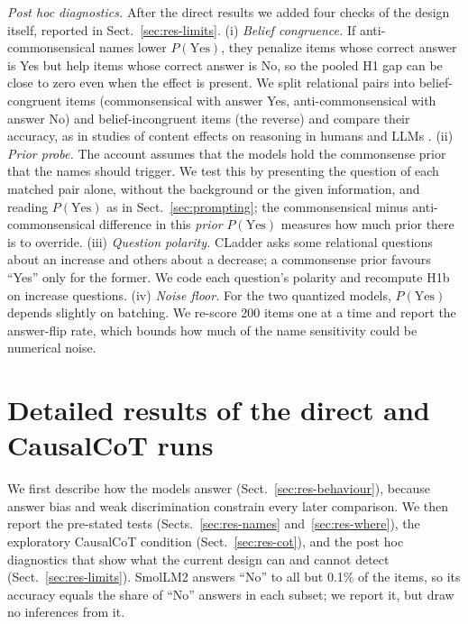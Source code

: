 \emph{Post hoc diagnostics.} After the direct results we added four checks of the design itself, reported in Sect.~\ref{sec:res-limits}. (i) \emph{Belief congruence.} If anti-commonsensical names lower $P(\text{Yes})$, they penalize items whose correct answer is Yes but help items whose correct answer is No, so the pooled H1 gap can be close to zero even when the effect is present. We split relational pairs into belief-congruent items (commonsensical with answer Yes, anti-commonsensical with answer No) and belief-incongruent items (the reverse) and compare their accuracy, as in studies of content effects on reasoning in humans and LLMs \cite{dasgupta2024language}. (ii) \emph{Prior probe.} The account assumes that the models hold the commonsense prior that the names should trigger. We test this by presenting the question of each matched pair alone, without the background or the given information, and reading $P(\text{Yes})$ as in Sect.~\ref{sec:prompting}; the commonsensical minus anti-commonsensical difference in this \emph{prior} $P(\text{Yes})$ measures how much prior there is to override. (iii) \emph{Question polarity.} CLadder asks some relational questions about an increase and others about a decrease; a commonsense prior favours ``Yes'' only for the former. We code each question's polarity and recompute H1b on increase questions. (iv) \emph{Noise floor.} For the two quantized models, $P(\text{Yes})$ depends slightly on batching. We re-score 200 items one at a time and report the answer-flip rate, which bounds how much of the name sensitivity could be numerical noise.


\section{Detailed results of the direct and CausalCoT runs}
\label{app:results}

We first describe how the models answer (Sect.~\ref{sec:res-behaviour}), because answer bias and weak discrimination constrain every later comparison. We then report the pre-stated tests (Sects.~\ref{sec:res-names} and~\ref{sec:res-where}), the exploratory CausalCoT condition (Sect.~\ref{sec:res-cot}), and the post hoc diagnostics that show what the current design can and cannot detect (Sect.~\ref{sec:res-limits}). SmolLM2 answers ``No'' to all but 0.1\% of the items, so its accuracy equals the share of ``No'' answers in each subset; we report it, but draw no inferences from it.

